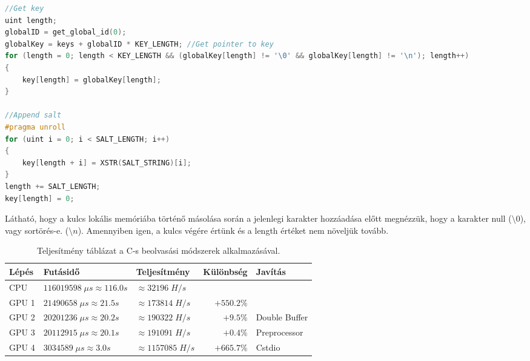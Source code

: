 \begin{lstlisting}[language={C++}]
//Get key
uint length;
globalID = get_global_id(0);
globalKey = keys + globalID * KEY_LENGTH; //Get pointer to key
for (length = 0; length < KEY_LENGTH && (globalKey[length] != '\0' && globalKey[length] != '\n'); length++)
{
    key[length] = globalKey[length];
}

//Append salt
#pragma unroll
for (uint i = 0; i < SALT_LENGTH; i++)
{
    key[length + i] = XSTR(SALT_STRING)[i];
}
length += SALT_LENGTH;
key[length] = 0;
\end{lstlisting}


Látható, hogy a kulcs lokális memóriába történő másolása során a jelenlegi karakter hozzáadása előtt megnézzük, hogy a karakter null ($\setminus 0$), vagy sortörés-e. ($\setminus n$). Amennyiben igen, a kulcs végére értünk és a length értéket nem növeljük tovább.

\begin{table}[H]
    \centering
    \begin{tabular}{l|l|l|r|l}
        \textbf{Lépés} & \textbf{Futásidő} & \textbf{Teljesítmény} & \textbf{Különbség} & \textbf{Javítás} \\
        \hline
        \hline
        
        CPU & $\num{116 019 598} \; \mu s \approx \num{116.0}s $ & $\approx \num{32 196} \; H/s$ & & \\
        \hline
                            
        GPU 1 & $\num{21 490 658} \; \mu s \approx \num{21.5}s $ & $\approx \num{173 814} \; H/s$ & $+550.2\%$ & \\
        \hline
        
        GPU 2 & $\num{20 201 236} \; \mu s \approx \num{20.2}s $ & $\approx \num{190 322} \; H/s$ & $+9.5\%$ & Double Buffer \\
        \hline
        
        GPU 3 & $\num{20 112 915} \; \mu s \approx \num{20.1}s $ & $\approx \num{191 091} \; H/s$ & $+0.4\%$ & Preprocessor \\
        \hline
        
        GPU 4 & $\num{3 034 589} \; \mu s \approx \num{3.0}s $ & $\approx \num{1 157 085} \; H/s$ & $+665.7\%$ & Cstdio \\
        \hline
    \end{tabular}
    \caption{Teljesítmény táblázat a C-s beolvasási módszerek alkalmazásával.}
\end{table}



